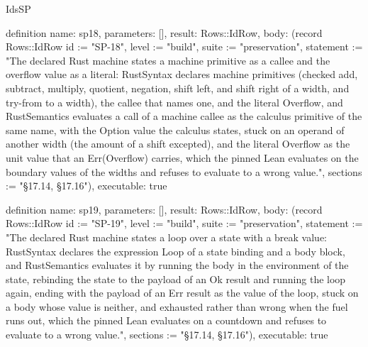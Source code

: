 \begin{lexlean}{IdsSP}
\begin{semanticmodule}
definition{
  name: sp18,
  parameters: [],
  result: Rows::IdRow,
  body: (record Rows::IdRow {id := "SP-18", level := "build", suite := "preservation", statement := "The declared Rust machine states a machine primitive as a callee and the overflow value as a literal: RustSyntax declares machine primitives (checked add, subtract, multiply, quotient, negation, shift left, and shift right of a width, and try-from to a width), the callee that names one, and the literal Overflow, and RustSemantics evaluates a call of a machine callee as the calculus primitive of the same name, with the Option value the calculus states, stuck on an operand of another width (the amount of a shift excepted), and the literal Overflow as the unit value that an Err(Overflow) carries, which the pinned Lean evaluates on the boundary values of the widths and refuses to evaluate to a wrong value.", sections := "§17.14, §17.16"}),
  executable: true
}

definition{
  name: sp19,
  parameters: [],
  result: Rows::IdRow,
  body: (record Rows::IdRow {id := "SP-19", level := "build", suite := "preservation", statement := "The declared Rust machine states a loop over a state with a break value: RustSyntax declares the expression Loop of a state binding and a body block, and RustSemantics evaluates it by running the body in the environment of the state, rebinding the state to the payload of an Ok result and running the loop again, ending with the payload of an Err result as the value of the loop, stuck on a body whose value is neither, and exhausted rather than wrong when the fuel runs out, which the pinned Lean evaluates on a countdown and refuses to evaluate to a wrong value.", sections := "§17.14, §17.16"}),
  executable: true
}


\end{semanticmodule}
\end{lexlean}
